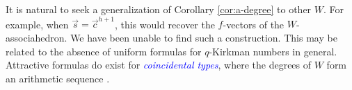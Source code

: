 \documentclass[submission]{FPSAC2025}
\newcommand{\dfemph}[1]{\textcolor{blue}{\emph{#1}}}
\newcommand{\m}{p}
\newcommand{\Cat}{\mathrm{Cat}}
\begin{document}
It is natural to seek a generalization of Corollary \ref{cor:a-degree} to other $W$.
For example, when $\vec{s} = \vec{c}^{h + 1}$, this would recover the $f$-vectors of the $W$-associahedron.
We have been unable to find such a construction.
This may be related to the absence of uniform formulas for $q$-Kirkman numbers in general.
Attractive formulas do exist for \dfemph{coincidental types}, where the degrees of $W$ form an arithmetic sequence \cite[\S{10}]{rss}.




\printbibliography
\end{document}
